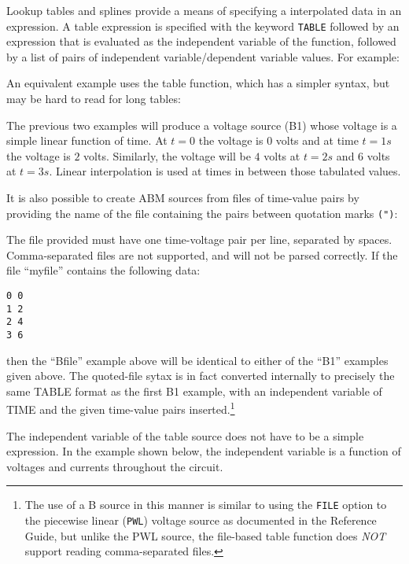 Lookup tables and splines provide a means of
specifying a interpolated data in an expression.  A table expression is
specified with the keyword \verb+TABLE+ followed by an expression that
is evaluated as the independent variable of the function, followed by a
list of pairs of independent variable/dependent variable values.  For
example:


An equivalent example uses the table function, which has a simpler syntax, but
 may be hard to read for long tables:


The previous two examples will produce a voltage source (B1) whose voltage
is a simple linear function of time.  At $t=0$ the voltage is $0$ volts and 
at time $t=1s$ the voltage is $2$ volts.  Similarly, the voltage will
be $4$ volts at $t=2s$ and $6$ volts at $t=3s$. Linear interpolation is
used at times in between those tabulated values.

It is also possible to create ABM sources from files of time-value pairs by providing the name of the file containing the pairs between quotation marks \texttt{(")}:


The file provided must have one time-voltage pair per line, separated
by spaces.  Comma-separated files are not supported, and will not be
parsed correctly.  If the file ``myfile'' contains the following data:
\begin{verbatim}
0 0
1 2
2 4
3 6
\end{verbatim}
then the ``Bfile'' example above will be identical to either of the
``B1'' examples given above.  The quoted-file sytax is in fact converted
internally to precisely the same TABLE format as the first B1 example,
with an independent variable of TIME and the given time-value pairs
inserted.\footnote{The use of a B source in this manner is similar to using the \texttt{FILE} option to the piecewise linear (\texttt{PWL}) voltage source as documented in the \Xyce{} Reference Guide\ReferenceGuide, but unlike the PWL source, the file-based table function does {\em NOT\/} support reading comma-separated files.}

The independent variable of the table source does not have to be a
simple expression.  In the example shown below, the independent variable is
a function of voltages and currents throughout the circuit.

